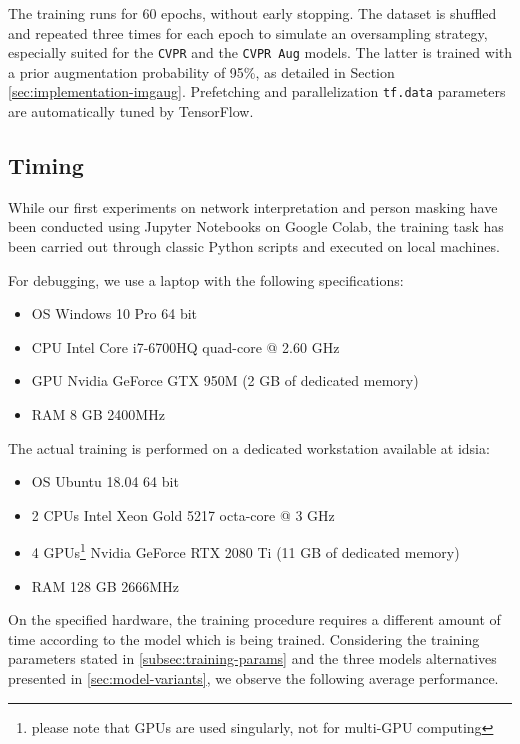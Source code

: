 The training runs for 60 epochs, without early stopping. The dataset is shuffled and repeated three times for each epoch to simulate an oversampling strategy, especially suited for the \texttt{CVPR} and the \texttt{CVPR Aug} models. The latter is trained with a prior augmentation probability of 95\%, as detailed in Section \ref{sec:implementation-imgaug}. Prefetching and parallelization \texttt{tf.data} parameters are automatically tuned by TensorFlow.



\clearpage
\subsection{Timing}
\label{subsec:training-timing}

While our first experiments on network interpretation and person masking have been conducted using Jupyter Notebooks on Google Colab, the training task has been carried out through classic Python scripts and executed on local machines.

\medskip

For debugging, we use a laptop with the following specifications:
\begin{itemize}
    \item OS Windows 10 Pro 64 bit
    \item CPU Intel Core i7-6700HQ quad-core @ 2.60 GHz
    \item GPU Nvidia GeForce GTX 950M (2 GB of dedicated memory)
    \item RAM 8 GB 2400MHz
\end{itemize}

The actual training is performed on a dedicated workstation available at \gls{idsia}:
\begin{itemize}
    \item OS Ubuntu 18.04 64 bit
    \item 2 CPUs Intel Xeon Gold 5217 octa-core @ 3 GHz
    \item 4 GPUs\footnote{please note that GPUs are used singularly, not for multi-GPU computing} Nvidia GeForce RTX 2080 Ti (11 GB of dedicated memory)
    \item RAM 128 GB 2666MHz
\end{itemize}

\medskip
    
On the specified hardware, the training procedure requires a different amount of time according to the model which is being trained. Considering the training parameters stated in \ref{subsec:training-params} and the three models alternatives presented in \ref{sec:model-variants}, we observe the following average performance.

